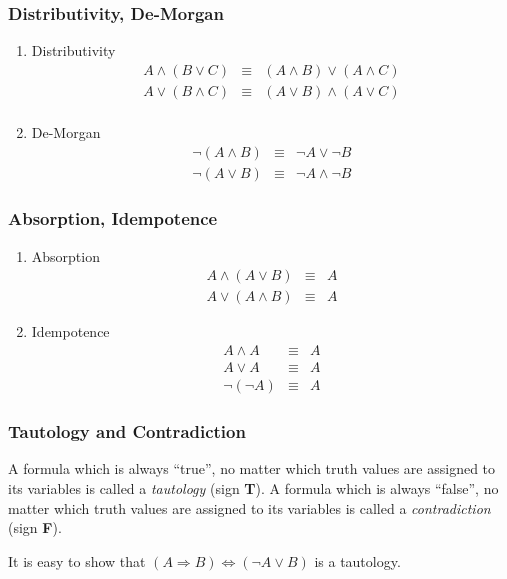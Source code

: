 \documentclass{beamer}
\theoremstyle{remark}
\begin{document}
\begin{frame}
\frametitle{Distributivity, De-Morgan}
\begin{theorem}
\begin{enumerate}
	\item Distributivity	\begin{eqnarray*}
						A \land (B \lor C) & \equiv & (A \land B) \lor (A \land C) \\
						A \lor (B \land C) & \equiv & (A \lor B) \land (A \lor C) \\
					\end{eqnarray*}
	\pause
	\item De-Morgan	\begin{eqnarray*}
						\lnot(A \land B) & \equiv & \lnot A \lor \lnot B \\
						\lnot(A \lor B) & \equiv & \lnot A \land \lnot B
					\end{eqnarray*}
\end{enumerate}
\end{theorem}
\end{frame}

\begin{frame}
\frametitle{Absorption, Idempotence}
\begin{theorem}
\begin{enumerate}
	\item Absorption	\begin{eqnarray*}
						A \land (A \lor B) & \equiv &  A \\
						A \lor (A \land B) & \equiv &  A 
					\end{eqnarray*}
	\pause
	\item Idempotence	\begin{eqnarray*}
						A \land A & \equiv & A \\
						A \lor A & \equiv & A \\
						\lnot(\lnot A) & \equiv & A 
					\end{eqnarray*}
\end{enumerate}
\end{theorem}
\end{frame}

\begin{frame}
 \frametitle{Tautology and Contradiction}
 \begin{definition}
 A formula which is always ``true'', no matter which truth values are assigned to its variables is called a {\em tautology} (sign {\bf T}). A formula which is always ``false'', no matter which truth values are assigned to its variables is called a {\em contradiction} (sign {\bf F}).
 \end{definition}
 \pause
\begin{example}
 It is easy to show that $(A \Rightarrow B) \Leftrightarrow (\lnot A \lor B)$ is a tautology.
\end{example}
\end{frame}
\end{document}
